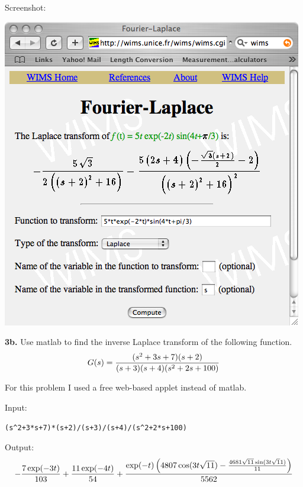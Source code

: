 \documentclass[11pt]{report}
\begin{document}
\bigskip
\noindent
Screenshot:
\begin{center}
\includegraphics[scale=0.5]{images/laplace-tool.png}
\end{center}

\newpage

\noindent
{\bf 3b.} Use {\sc matlab} to find the inverse Laplace transform of the following
function.
$$G(s)={(s^2+3s+7)(s+2)\over(s+3)(s+4)(s^2+2s+100)}$$

\bigskip
\noindent
For this problem I used a free web-based applet instead of {\sc matlab}.

\bigskip
\noindent
Input:
\begin{center}
\verb$(s^2+3*s+7)*(s+2)/(s+3)/(s+4)/(s^2+2*s+100)$
\end{center}

\bigskip
\noindent
Output:
$$-{7\exp(-3t)\over103}
+{11\exp(-4t)\over54}
+{\exp(-t)
\left(4807\cos(3t\sqrt{11})-{4681\sqrt{11}\sin(3t\sqrt11)\over11}\right)
\over5562}$$
\end{document}
